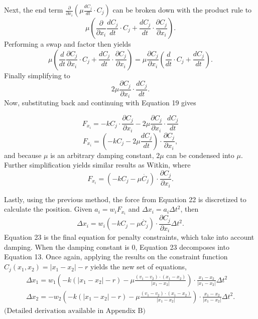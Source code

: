 \documentclass[12pt, letterpaper]{article}
\begin{document}
Next, the end term $\frac{\partial}{\partial x_{i}} (\mu \frac{d C_j}{d t} \cdot C_j)$ can be broken down with the product rule to
$$\mu \left( \frac{\partial}{\partial x_{i}} \frac{dC_j}{dt} \cdot C_j + \frac{dC_j}{dt} \cdot \frac{\partial C_j}{\partial x_{i}} \right).$$
Performing a swap and factor then yields
$$\mu \left(\frac{d}{dt} \frac{\partial C_j}{\partial x_{i}}  \cdot C_j + \frac{dC_j}{dt} \cdot \frac{\partial C_j}{\partial x_{i}} \right) = \mu  \frac{\partial C_j}{\partial x_{i}} \left(\frac{d}{dt} \cdot C_j + \frac{dC_j}{dt}\right). $$
Finally simplifying to
\begin{equation}
    2 \mu \frac{\partial C_j}{\partial x_{i}} \cdot \frac{dC_j}{dt}.
\end{equation}
Now, substituting back and continuing with Equation 19 gives

$$F_{x_{i}} = -kC_j \cdot \frac{\partial C_j}{\partial x_{i}} - 2 \mu \frac{\partial C_j}{\partial x_{i}} \cdot \frac{dC_j}{dt}$$
\begin{equation}
     F_{x_{i}} = \left(-kC_j - 2\mu \frac{d C_j}{d t}\right)\cdot \frac{\partial C_j}{\partial x_{i}},
\end{equation}
and because $\mu$ is an arbitrary damping constant, $2\mu$ can be condensed into $\mu$. Further simplification yields similar results as Witkin, where
\begin{equation}
    F_{x_{i}} = (-kC_j - \mu \dot{C_j}) \cdot \frac{\partial C_j}{\partial x_{i}}.
\end{equation}

Lastly, using the previous method, the force from Equation 22 is discretized to calculate the position.
Given $a_{i} = w_{i}F_{x_{i}}$ and $\Delta x_{i} = a_{i}  \Delta t ^{2}$, then
\begin{equation}
    \Delta x_{i} = w_{i}(-kC_j - \mu \dot{C_j}) \cdot \frac{\partial C_j}{\partial x_{i}} \Delta t^{2}.
\end{equation}
Equation 23 is the final equation for penalty constraints, which take into account damping. When the damping constant is 0, Equation 23 decomposes into Equation 13. Once again, applying the results on the constraint function $C_j(x_{1},x_{2}) = |x_{1}-x_{2}|-r$ yields the new set of equations,
\begin{equation}
    \begin{gathered}
        \Delta x_{1} = w_{1}\left(-k(|x_{1}-x_{2}|-r) - \mu \frac{(v_{1} - v_{2}) \cdot (x_{1} - x_{2})}{|x_{1}-x_{2}|}\right) \cdot \frac{x_{1}-x_{2}}{|x_{1}-x_{2}|} \Delta t^{2}\\
        \Delta x_{2} = -w_{2}\left(-k(|x_{1}-x_{2}|-r) - \mu \frac{(v_{1} - v_{2}) \cdot (x_{1} - x_{2})}{|x_{1}-x_{2}|}\right) \cdot \frac{x_{1}-x_{2}}{|x_{1}-x_{2}|} \Delta t^{2}.
    \end{gathered}
\end{equation}
$\text{(Detailed derivation available in Appendix B)}$
\end{document}
